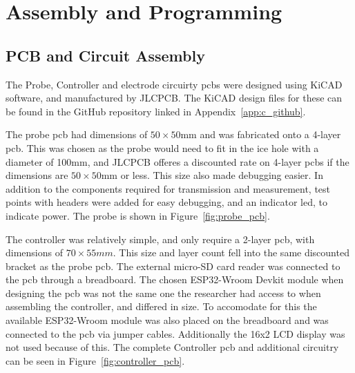 \section{Assembly and Programming}
\subsection{PCB and Circuit Assembly}
The Probe, Controller and electrode circuirty \gls{pcb}s were designed using KiCAD software, and manufactured by JLCPCB. The KiCAD design files for these can be found in the GitHub repository linked in Appendix~\ref{app:c_github}.

The probe \gls{pcb} had dimensions of $50\times50$mm and was fabricated onto a 4-layer \gls{pcb}.
This was chosen as the probe would need to fit in the ice hole with a diameter of 100mm, and JLCPCB offeres a discounted rate on 4-layer \gls{pcb}s if the dimensions are $50\times50$mm or less. 
This size also made debugging easier.
In addition to the components required for transmission and measurement, test points with headers were added for easy debugging, and an indicator \gls{led}, to indicate power.
The probe is shown in Figure~\ref{fig:probe_pcb}.



The controller was relatively simple, and only require a 2-layer \gls{pcb}, with dimensions of $70\times55mm$.
This size and layer count fell into the same discounted bracket as the probe \gls{pcb}.
The external micro-SD card reader was connected to the \gls{pcb} through a breadboard.
The chosen ESP32-Wroom Devkit module when designing the \gls{pcb} was not the same one the researcher had access to when assembling the controller, and differed in size.
To accomodate for this the available ESP32-Wroom module was also placed on the breadboard and was connected to the \gls{pcb} via jumper cables.
Additionally the 16x2 LCD display was not used because of this.
The complete Controller \gls{pcb} and additional circuitry can be seen in Figure~\ref{fig:controller_pcb}.

